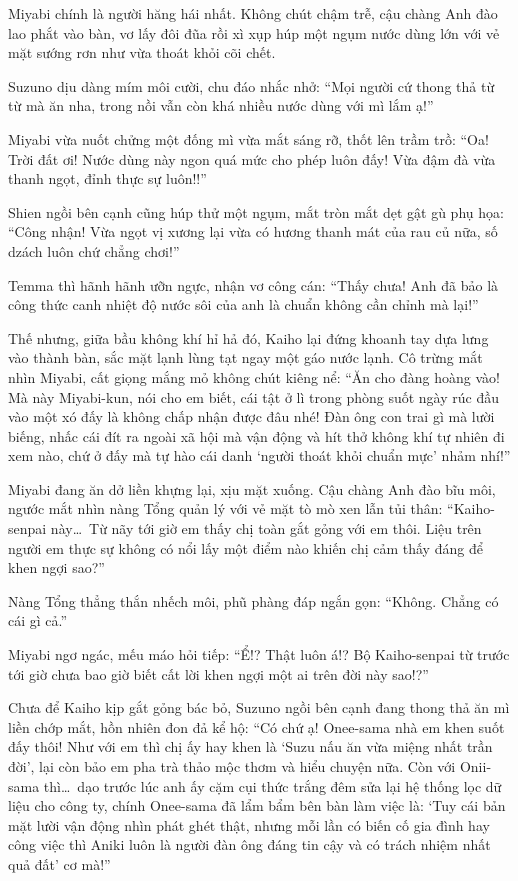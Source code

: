 \documentclass[../main.tex]{subfiles}
\begin{document}
Miyabi chính là người hăng hái nhất. Không chút chậm trễ, cậu chàng Anh đào lao phắt vào bàn, vơ lấy đôi đũa rồi xì xụp húp một ngụm nước dùng lớn với vẻ mặt sướng rơn như vừa thoát khỏi cõi chết.


Suzuno dịu dàng mím môi cười, chu đáo nhắc nhở: ``Mọi người cứ thong thả từ từ mà ăn nha, trong nồi vẫn còn khá nhiều nước dùng với mì lắm ạ!''

Miyabi vừa nuốt chửng một đống mì vừa mắt sáng rỡ, thốt lên trầm trồ: ``Oa! Trời đất ơi! Nước dùng này ngon quá mức cho phép luôn đấy! Vừa đậm đà vừa thanh ngọt, đỉnh thực sự luôn!!''

Shien ngồi bên cạnh cũng húp thử một ngụm, mắt tròn mắt dẹt gật gù phụ họa: ``Công nhận! Vừa ngọt vị xương lại vừa có hương thanh mát của rau củ nữa, số dzách luôn chứ chẳng chơi!''

Temma thì hãnh hãnh ưỡn ngực, nhận vơ công cán: ``Thấy chưa! Anh đã bảo là công thức canh nhiệt độ nước sôi của anh là chuẩn không cần chỉnh mà lại!''

Thế nhưng, giữa bầu không khí hỉ hả đó, Kaiho lại đứng khoanh tay dựa lưng vào thành bàn, sắc mặt lạnh lùng tạt ngay một gáo nước lạnh. Cô trừng mắt nhìn Miyabi, cất giọng mắng mỏ không chút kiêng nể: ``Ăn cho đàng hoàng vào! Mà này Miyabi-kun, nói cho em biết, cái tật ở lì trong phòng suốt ngày rúc đầu vào một xó đấy là không chấp nhận được đâu nhé! Đàn ông con trai gì mà lười biếng, nhấc cái đít ra ngoài xã hội mà vận động và hít thở không khí tự nhiên đi xem nào, chứ ở đấy mà tự hào cái danh `người thoát khỏi chuẩn mực' nhảm nhí!''

Miyabi đang ăn dở liền khựng lại, xịu mặt xuống. Cậu chàng Anh đào bĩu môi, ngước mắt nhìn nàng Tổng quản lý với vẻ mặt tò mò xen lẫn tủi thân: ``Kaiho-senpai này\dots\ Từ nãy tới giờ em thấy chị toàn gắt gỏng với em thôi. Liệu trên người em thực sự không có nổi lấy một điểm nào khiến chị cảm thấy đáng để khen ngợi sao?''

Nàng Tổng thẳng thắn nhếch môi, phũ phàng đáp ngắn gọn: ``Không. Chẳng có cái gì cả.''

Miyabi ngơ ngác, mếu máo hỏi tiếp: ``Ể!? Thật luôn á!? Bộ Kaiho-senpai từ trước tới giờ chưa bao giờ biết cất lời khen ngợi một ai trên đời này sao!?''

Chưa để Kaiho kịp gắt gỏng bác bỏ, Suzuno ngồi bên cạnh đang thong thả ăn mì liền chớp mắt, hồn nhiên đon đả kể hộ: ``Có chứ ạ! Onee-sama nhà em khen suốt đấy thôi! Như với em thì chị ấy hay khen là `Suzu nấu ăn vừa miệng nhất trần đời', lại còn bảo em pha trà thảo mộc thơm và hiểu chuyện nữa. Còn với Onii-sama thì\dots\ dạo trước lúc anh ấy cặm cụi thức trắng đêm sửa lại hệ thống lọc dữ liệu cho công ty, chính Onee-sama đã lẩm bẩm bên bàn làm việc là: `Tuy cái bản mặt lười vận động nhìn phát ghét thật, nhưng mỗi lần có biến cố gia đình hay công việc thì Aniki luôn là người đàn ông đáng tin cậy và có trách nhiệm nhất quả đất' cơ mà!''
\end{document}
